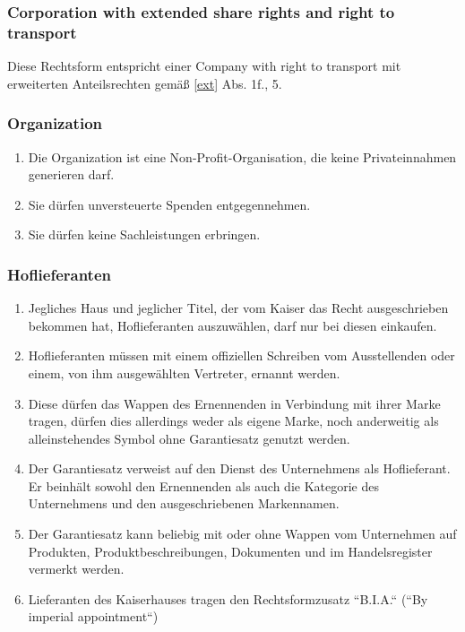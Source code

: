 \documentclass{article}
\begin{document}
\subsubsection{Corporation with extended share rights and right to transport}
Diese Rechtsform entspricht einer Company with right to transport mit erweiterten Anteilsrechten gemäß \ref{ext} Abs. 1f., 5.

\subsubsection{Organization}
\begin{enumerate}[(1)]
    \item Die Organization ist eine Non-Profit-Organisation, die keine Privateinnahmen generieren darf.
    \item Sie dürfen unversteuerte Spenden entgegennehmen.
    \item Sie dürfen keine Sachleistungen erbringen.
\end{enumerate}

\subsubsection{Hoflieferanten}
\begin{enumerate}[(1)]
    \item Jegliches Haus und jeglicher Titel, der vom Kaiser das Recht ausgeschrieben bekommen hat, Hoflieferanten auszuwählen, darf nur bei diesen einkaufen.
    \item Hoflieferanten müssen mit einem offiziellen Schreiben vom Ausstellenden oder einem, von ihm ausgewählten Vertreter, ernannt werden.
    \item Diese dürfen das Wappen des Ernennenden in Verbindung mit ihrer Marke tragen, dürfen dies allerdings weder als eigene Marke, noch anderweitig als alleinstehendes Symbol ohne Garantiesatz genutzt werden.
    \item Der Garantiesatz verweist auf den Dienst des Unternehmens als Hoflieferant. Er beinhält sowohl den Ernennenden als auch die Kategorie des Unternehmens und den ausgeschriebenen Markennamen.
    \item Der Garantiesatz kann beliebig mit oder ohne Wappen vom Unternehmen auf Produkten, Produktbeschreibungen, Dokumenten und im Handelsregister vermerkt werden.
    \item Lieferanten des Kaiserhauses tragen den Rechtsformzusatz ``B.I.A.`` (``By imperial appointment``)
\end{enumerate}
\end{document}
